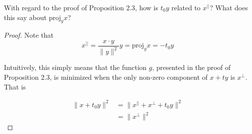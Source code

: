 \begin{exercise} \label{e1.2.9}
    With regard to the proof of Proposition 2.3, how is \( t_0y \) related to \( x^{\vert \vert} \)? What does this say about \( \text{proj}_y x \)?
    
    \begin{proof}
        Note that
        \[ x^{\vert \vert} = \frac{x \cdot y}{\lVert y \rVert^2} y = \text{proj}_y x = -t_0y\]
        
        Intuitively, this simply means that the function \( g \), presented in the proof of Proposition 2.3, is minimized when the only non-zero component of \( x + ty \) is \( x^{\perp} \). That is
        
        \begin{align*}
            \lVert x+t_0y \rVert^2 &= \lVert x^{\vert\vert}+x^{\perp}+t_0y \rVert^2 \\
            &= \lVert x^{\perp} \rVert^2
        \end{align*}
    \end{proof}
\end{exercise} %

